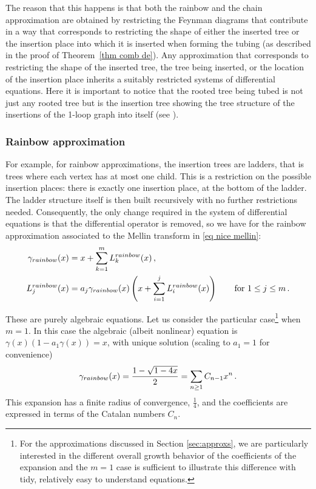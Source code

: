 \documentclass[oneside]{amsart}
\theoremstyle{definition}
\begin{document}
The reason that this happens is that both the rainbow and the chain approximation are obtained by restricting the Feynman diagrams that contribute in a way that corresponds to restricting the shape of either the inserted tree or the insertion place into which it is inserted when forming the tubing (as described in the proof of Theorem~\ref{thm comb de}).  Any approximation that corresponds to restricting the shape of the inserted tree, the tree being inserted, or the location of the insertion place inherits a suitably restricted systems of differential equations.  Here it is important to notice that the rooted tree being tubed is not just any rooted tree but is the insertion tree showing the tree structure of the insertions of the 1-loop graph into itself (see \cite{BCEFNOHY}).

\subsubsection{Rainbow approximation}
For example, for rainbow approximations, the insertion trees are ladders, that is trees where each vertex has at most one child.  This is a restriction on the possible insertion places: there is exactly one insertion place, at the bottom of the ladder.  The ladder structure itself is then built recursively with no further restrictions needed.  Consequently, the only change required in the system of differential equations is that the differential operator is removed, so we have for the rainbow approximation associated to the Mellin transform in \eqref{eq nice mellin}:
\begin{align*} \gamma_{\rm rainbow}(x) & = x + \sum_{k=1}^m L_k^{\rm rainbow}(x)\,, \\
 L_j^{\rm rainbow}(x) & = a_j \gamma_{\rm rainbow}(x) \left(x + \sum_{i=1}^{j}L_i^{\rm rainbow}(x)\right) \qquad \text{for $1\leq j\leq m$}\,. \end{align*}

These are purely algebraic equations.  Let us consider the particular case\footnote{For the approximations discussed in Section \ref{sec:approxs}, we are particularly interested in the different overall growth behavior of the coefficients of the expansion and the $m=1$ case is sufficient to illustrate this difference with tidy, relatively easy to understand equations.} 
%
when $m=1$.  In this case the algebraic (albeit nonlinear) equation is %
$\gamma(x)(1- a_1 \gamma(x))=x$, with unique solution (scaling to $a_1=1$ for convenience)
\[
\gamma_{\rm rainbow}(x)=\frac{1-\sqrt{1-4 x}}{2}=\sum_{n\geq 1} C_{n-1} x^{n}\,.
\]
This expansion has a finite radius of convergence, $\frac{1}{4}$, and the coefficients are expressed in terms of the Catalan numbers $C_n$.
\end{document}

